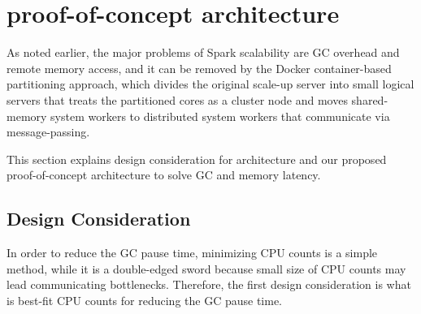 \section{proof-of-concept architecture}

As noted earlier, the major problems of Spark scalability are
GC overhead and remote memory access, and it can be removed by the Docker container-based 
partitioning approach, which divides the 
original scale-up server into small logical servers that treats the partitioned 
cores as a cluster node and moves shared-memory system workers to distributed system
workers that communicate via message-passing.

This section explains design consideration for architecture and our proposed proof-of-concept 
architecture to solve GC and memory latency.



\subsection{Design Consideration}

In order to reduce the GC pause time, minimizing CPU counts is a simple method, 
while it is a double-edged sword because small size of CPU counts may lead 
communicating bottlenecks.
Therefore, the first design consideration is what is 
best-fit CPU counts for reducing the GC pause time.

